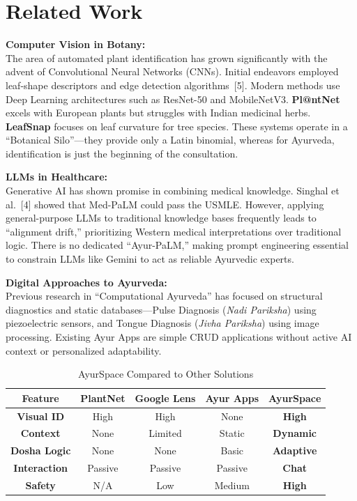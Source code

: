 \newpage

\section{Related Work}

\noindent\textbf{Computer Vision in Botany:}\\
The area of automated plant identification has grown significantly with the advent of
Convolutional Neural Networks (CNNs). Initial endeavors employed leaf-shape descriptors
and edge detection algorithms~[5]. Modern methods use Deep Learning
architectures such as ResNet-50 and MobileNetV3. \textbf{Pl@ntNet} excels with European
plants but struggles with Indian medicinal herbs. \textbf{LeafSnap} focuses on leaf
curvature for tree species. These systems operate in a ``Botanical Silo''---they provide
only a Latin binomial, whereas for Ayurveda, identification is just the beginning of the
consultation.

\vspace{5mm}
\noindent\textbf{LLMs in Healthcare:}\\
Generative AI has shown promise in combining medical knowledge. Singhal et al.~[4]
showed that Med-PaLM could pass the USMLE. However, applying general-purpose LLMs to
traditional knowledge bases frequently leads to ``alignment drift,'' prioritizing Western
medical interpretations over traditional logic. There is no dedicated ``Ayur-PaLM,''
making prompt engineering essential to constrain LLMs like Gemini to act as reliable
Ayurvedic experts.

\vspace{5mm}
\noindent\textbf{Digital Approaches to Ayurveda:}\\
Previous research in ``Computational Ayurveda'' has focused on structural diagnostics
and static databases---Pulse Diagnosis (\textit{Nadi Pariksha}) using piezoelectric
sensors, and Tongue Diagnosis (\textit{Jivha Pariksha}) using image processing. Existing
Ayur Apps are simple CRUD applications without active AI context or personalized
adaptability.

\vspace{5mm}
\begin{table}[H]
\caption{AyurSpace Compared to Other Solutions}
\begin{center}
\begin{tabular}{|c|c|c|c|c|}
\hline
\textbf{Feature} & \textbf{PlantNet} & \textbf{Google Lens} & \textbf{Ayur Apps} & \textbf{AyurSpace} \\
\hline
\textbf{Visual ID} & High & High & None & \textbf{High} \\
\hline
\textbf{Context} & None & Limited & Static & \textbf{Dynamic} \\
\hline
\textbf{Dosha Logic} & None & None & Basic & \textbf{Adaptive} \\
\hline
\textbf{Interaction} & Passive & Passive & Passive & \textbf{Chat} \\
\hline
\textbf{Safety} & N/A & Low & Medium & \textbf{High} \\
\hline
\end{tabular}
\end{center}
\end{table}

